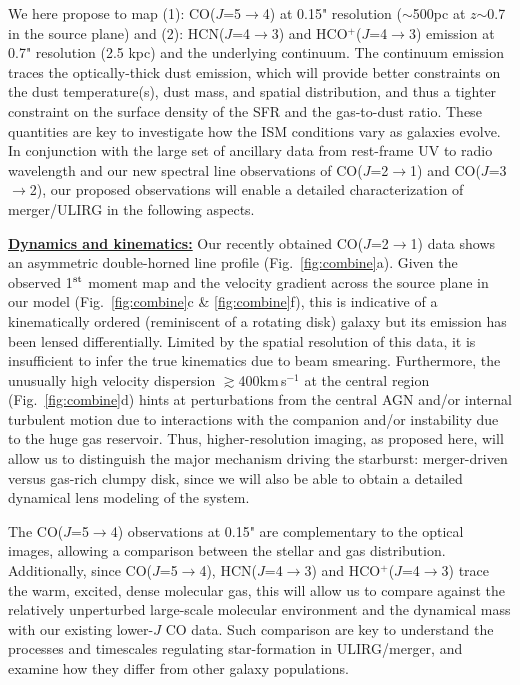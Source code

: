\documentclass[12pt,a4paper]{article}
\newcommand{\rarr}{$\rightarrow$}
\newcommand{\bco}{\mbox{CO($J$=2\rarr1)}\xspace}
\newcommand{\eco}{\mbox{CO($J$=5\rarr4)}\xspace}
\newcommand{\rot}[3][HCN]{\mbox{#1($J$=#2\rarr#3)}\xspace}
\newcommand{\dhcn}{HCN($J$=4\rarr3)\xspace}
\newcommand{\dhcop}{HCO$^+$($J$=4\rarr3)\xspace}
\newcommand{\kms}{km\,s$^{-1}$\xspace}
\newcommand{\Fig}[1]{Fig.~\ref{fig:#1}}
\begin{document}
We here propose to map (1): \eco at 0.15" resolution ($\sim$500pc at $z$$\sim$0.7 in the source plane) and 
(2): \dhcn and \dhcop emission at 0.7" resolution (2.5 kpc) and the underlying continuum.
The continuum emission traces the optically-thick dust emission, which 
will provide better constraints on the dust temperature(s), dust mass,
and spatial distribution, and thus a tighter constraint on the surface density of the SFR and 
the gas-to-dust ratio. These quantities are key to investigate how the ISM conditions 
vary as galaxies evolve.
In conjunction with the large set of ancillary data from
rest-frame UV to radio wavelength and our new spectral line observations of \bco and \rot[CO]{3}{2}, our
proposed observations will enable a detailed characterization of 
merger/ULIRG in the following aspects.

\underline{\bf Dynamics and kinematics:}
Our recently obtained \bco data shows an asymmetric double-horned line profile (\Fig{combine}a). Given
the observed 1$^{\rm st}$ moment map and the velocity gradient
across the source plane in our model (\Fig{combine}c \& \ref{fig:combine}f), this is indicative of
a kinematically ordered (reminiscent of a rotating disk) galaxy but its emission 
has been lensed differentially. 
Limited by the spatial resolution of this data, it is insufficient to infer the true 
kinematics due to beam smearing.
Furthermore, the unusually high velocity dispersion 
$\gtrsim$400\kms at the central region (\Fig{combine}d) hints at 
perturbations from the central AGN and/or
internal turbulent motion due to interactions with the companion
and/or instability due to the huge gas reservoir.
Thus, higher-resolution imaging, as proposed here, will allow us to
distinguish the major mechanism driving the starburst: merger-driven 
versus gas-rich clumpy disk, since we will also be able to obtain a detailed
dynamical lens modeling of the system.

The \eco observations at 0.15" are complementary to the optical images,
allowing a comparison between the stellar and gas distribution. 
Additionally, since \eco, \dhcn and \dhcop trace the warm, excited, dense molecular gas,
this will allow us to compare against the relatively unperturbed large-scale 
molecular environment and the dynamical mass with our existing lower-$J$ CO data.
Such comparison are key to understand the processes and timescales regulating star-formation 
in ULIRG/merger, and examine how they differ from other galaxy populations.
\end{document}
